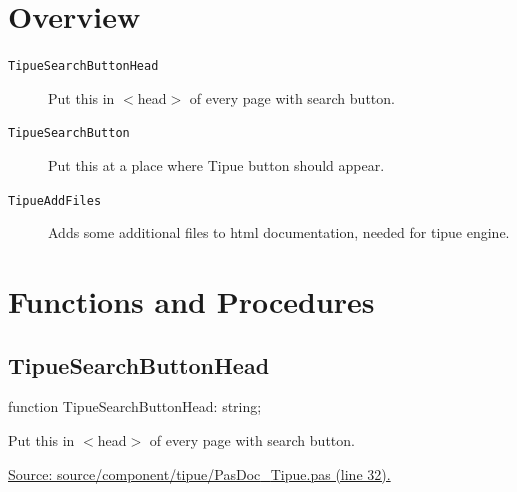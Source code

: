\documentclass{report}
\newif\ifpdf
\begin{document}
\section{Overview}
\begin{description}
\item[\texttt{TipueSearchButtonHead}]Put this in {$<$}head{$>$} of every page with search button.
\item[\texttt{TipueSearchButton}]Put this at a place where Tipue button should appear.
\item[\texttt{TipueAddFiles}]Adds some additional files to html documentation, needed for tipue engine.
\end{description}
\section{Functions and Procedures}
\ifpdf
\subsection*{\large{\textbf{TipueSearchButtonHead}}\normalsize\hspace{1ex}\hrulefill}
\else
\subsection*{TipueSearchButtonHead}
\fi
\label{PasDoc_Tipue-TipueSearchButtonHead}
\begin{list}{}{
\setlength{\itemindent}{0cm}
\setlength{\listparindent}{0cm}
\setlength{\leftmargin}{\evensidemargin}
\addtolength{\leftmargin}{\tmplength}
\settowidth{\labelsep}{X}
\addtolength{\leftmargin}{\labelsep}
\setlength{\labelwidth}{\tmplength}
}
\item[\textbf{Declaration}\hfill]
\ifpdf
\begin{flushleft}
\fi
\begin{ttfamily}
function TipueSearchButtonHead: string;\end{ttfamily}

\ifpdf
\end{flushleft}
\fi

\par
\item[\textbf{Description}]
Put this in {$<$}head{$>$} of every page with search button.\par
\href{https://github.com/pasdoc/pasdoc/blob/master/source/component/tipue/PasDoc_Tipue.pas#L32}{Source: source/component/tipue/PasDoc{\_}Tipue.pas (line 32).}

\end{list}
\ifpdf
\end{document}
